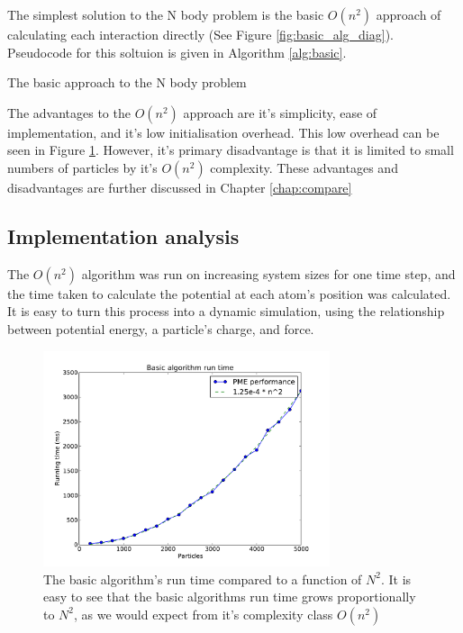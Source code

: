 \documentclass[pdftex,twoside,a4paper]{report}
\newcommand{\bcen}{\begin{center}}
\newcommand{\ecen}{\end{center}}
\begin{document}
The simplest solution to the N body problem is the basic $O(n^2)$ approach of calculating each interaction directly (See Figure \ref{fig:basic_alg_diag}). Pseudocode for this soltuion is given in Algorithm \ref{alg:basic}.\\

\begin{algorithm}
 \SetLine
 \caption{The basic approach to the N body problem}
 \label{alg:basic}
\end{algorithm}

The advantages to the $O(n^2)$ approach are it's simplicity, ease of implementation, and it's low initialisation overhead. This low overhead can be seen in Figure \ref{fig:basic_algo_complex}. However, it's primary disadvantage is that it is limited to small numbers of particles by it's $O(n^2)$ complexity. These advantages and disadvantages are further discussed in Chapter \ref{chap:compare}

\subsection{Implementation analysis}
The $O(n^2)$ algorithm was run on increasing system sizes for one time step, and the time taken to calculate the potential at each atom's position was calculated. It is easy to turn this process into a dynamic simulation, using the relationship between potential energy, a particle's charge, and force.
\begin{figure}
\bcen \includegraphics[width=0.75\textwidth]{figures/graphs/basic_algo_complex.pdf} \ecen
\caption{The basic algorithm's run time compared to a function of $N^2$. It is easy to see that the basic algorithms run time grows proportionally to $N^2$, as we would expect from it's complexity class $O(n^2)$}
\label{fig:basic_algo_complex}
\end{figure}
\end{document}
